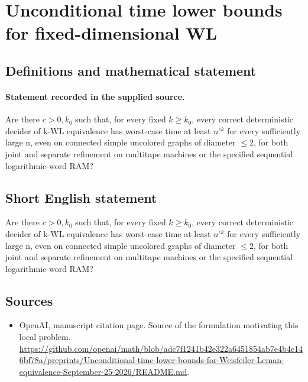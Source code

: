 \documentclass[11pt]{article}
\begin{document}
\section*{Unconditional time lower bounds for fixed-dimensional WL}\label{30007457}
\subsection{Definitions and mathematical statement}
\paragraph{Statement recorded in the supplied source.}
Are there $c>0,k_{0}$ such that, for every fixed $k\geq k_{0}$, every correct deterministic decider of k-WL equivalence has worst-case time at least $n^{ck}$ for every sufficiently large n, even on connected simple uncolored graphs of diameter $\leq 2$, for both joint and separate refinement on multitape machines or the specified sequential logarithmic-word RAM?
\subsection{Short English statement}
Are there $c>0,k_{0}$ such that, for every fixed $k\geq k_{0}$, every correct deterministic decider of k-WL equivalence has worst-case time at least $n^{ck}$ for every sufficiently large n, even on connected simple uncolored graphs of diameter $\leq 2$, for both joint and separate refinement on multitape machines or the specified sequential logarithmic-word RAM?
\subsection{Sources}
\begin{itemize}
\item[S1] OpenAI, manuscript citation page. Source of the formulation motivating this local problem.
\url{https://github.com/openai/math/blob/adc7f1241b42e322a6451854ab7e4b4c146bf78a/preprints/Unconditional-time-lower-bounds-for-Weisfeiler-Leman-equivalence-September-25-2026/README.md}.
\end{itemize}
\end{document}

